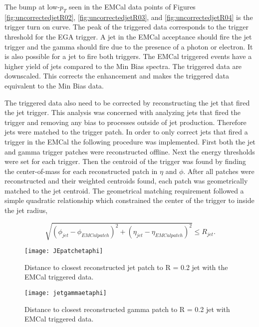 The bump at low-$p_{T}$ seen in the EMCal data points of Figures \ref{fig:uncorrectedjetR02}, \ref{fig:uncorrectedjetR03}, and \ref{fig:uncorrectedjetR04} is the trigger turn on curve. The peak of the triggered data corresponds to the trigger threshold for the EGA trigger.  A jet in the EMCal acceptance should fire the jet trigger and the gamma should fire due to the presence of a photon or electron. It is also possible for a jet to fire both triggers.  The EMCal triggered events have a higher yield of jets compared to the Min Bias spectra. The triggered data are downscaled.  This corrects the enhancement and makes the triggered data equivalent to the Min Bias data.  

The triggered data also need to be corrected by reconstructing the jet that fired the jet trigger.  This analysis was concerned with analyzing jets that fired the trigger and removing any bias to processes outside of jet production. Therefore jets were matched to the trigger patch.  In order to only correct jets that fired a trigger in the EMCal the following procedure was implemented.  First both the jet and gamma trigger patches were reconstructed offline.  Next the energy thresholds were set for each trigger.  Then the centroid of the trigger was found by finding the center-of-mass for each reconstructed patch in $\eta$ and $\phi$.  After all patches were reconstructed and their weighted centroids found, each patch was geometrically matched to the jet centroid.  The geometrical matching requirement followed a simple quadratic relationship which constrained the center of the trigger to inside the jet radius,

\begin{equation}
\sqrt{ ( \phi_{jet} - \phi_{EMCal patch} )^{2} + ( \eta_{jet} - \eta_{EMCal patch} )^{2}}  \leq R_{jet} .
\label{eq:triggermatch}
\end{equation}

\begin{figure}[h]
\texttt{[image: JEpatchetaphi]}
\centering
\caption{Distance to closest reconstructed jet patch to R = 0.2 jet with the EMCal triggered data.}
\label{fig:DisJetEJE}
\end{figure}

\begin{figure}[h]
\texttt{[image: jetgammaetaphi]}
\centering
\caption{Distance to closest reconstructed gamma patch to R = 0.2 jet with EMCal triggered data.}
\label{fig:DisJetEGA}
\end{figure}

